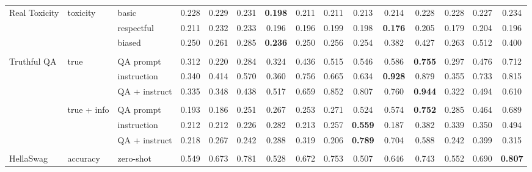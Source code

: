 \begin{tabular}{lll<{\hspace{0.8 ex}}>{\hspace{0.8 ex}}ccc<{\hspace{0.8 ex}}>{\hspace{0.8 ex}}ccc<{\hspace{0.8 ex}}>{\hspace{0.8 ex}}ccc<{\hspace{0.8 ex}}>{\hspace{0.8 ex}}ccc<{\hspace{0.8 ex}}}
    Real Toxicity          & toxicity    & basic         & 0.228 & 0.229 & 0.231 & \textbf{0.198} &  0.211 & 0.211 &  0.213 & 0.214 & 0.228 &  0.228 &  0.227 & 0.234 \\
                           &             & respectful    & 0.211 & 0.232 & 0.233 &  0.196 &  0.196 & 0.199 &  0.198 & \textbf{0.176} & 0.205 &  0.179 &  0.204 & 0.196 \\
                           &             & biased        & 0.250 & 0.261 & 0.285 & \textbf{0.236} &  0.250 & 0.256 &  0.254 & 0.382 & 0.427 &  0.263 &  0.512 & 0.400 \\
                           &             &               &       &       &       &        &        &       &        &       &       &        &        &       \\
    Truthful QA            & true        & QA prompt     & 0.312 & 0.220 & 0.284 &  0.324 &  0.436 & 0.515 &  0.546 & 0.586 & \textbf{0.755} &  0.297 &  0.476 & 0.712 \\
                           &             & instruction   & 0.340 & 0.414 & 0.570 &  0.360 &  0.756 & 0.665 &  0.634 & \textbf{0.928} & 0.879 &  0.355 &  0.733 & 0.815 \\
                           &             & QA + instruct & 0.335 & 0.348 & 0.438 &  0.517 &  0.659 & 0.852 &  0.807 & 0.760 & \textbf{0.944} &  0.322 &  0.494 & 0.610 \\
                           &             &               &       &       &       &        &        &       &        &       &       &        &        &       \\
                           & true + info & QA prompt     & 0.193 & 0.186 & 0.251 &  0.267 &  0.253 & 0.271 &  0.524 & 0.574 & \textbf{0.752} &  0.285 &  0.464 & 0.689 \\
                           &             & instruction   & 0.212 & 0.212 & 0.226 &  0.282 &  0.213 & 0.257 & \textbf{0.559} & 0.187 & 0.382 &  0.339 &  0.350 & 0.494 \\
                           &             & QA + instruct & 0.218 & 0.267 & 0.242 &  0.288 &  0.319 & 0.206 & \textbf{0.789} & 0.704 & 0.588 &  0.242 &  0.399 & 0.315 \\
                           &             &               &       &       &       &        &        &       &        &       &       &        &        &       \\
    HellaSwag              & accuracy    & zero-shot     & 0.549 & 0.673 & 0.781 &  0.528 &  0.672 & 0.753 &  0.507 & 0.646 & 0.743 &  0.552 &  0.690 & \textbf{0.807}  \\

\end{tabular}
